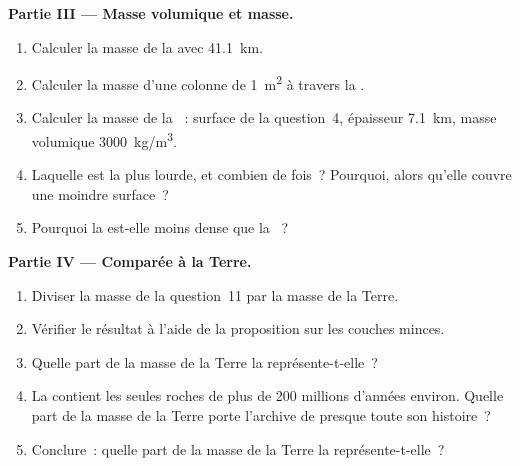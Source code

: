 \begin{problem}
\medskip
\noindent\textbf{Partie III --- Masse volumique et masse.}
\begin{enumerate}[resume]
  \item Calculer la masse de la  avec \qty{41.1}{km}.
  \item Calculer la masse d'une colonne de \qty{1}{m^2} à travers la .
  \item Calculer la masse de la ~: surface de la
        question~4, épaisseur \qty{7.1}{km}, masse volumique
        \qty{3000}{kg/m^3}.
  \item Laquelle est la plus lourde, et combien de fois~? Pourquoi, alors
        qu'elle couvre une moindre surface~?
  \item Pourquoi la  est-elle moins dense que la ~?
\end{enumerate}

\medskip
\noindent\textbf{Partie IV --- Comparée à la Terre.}
\begin{enumerate}[resume]
  \item Diviser la masse de la question~11 par la masse de la Terre.
  \item Vérifier le résultat à l'aide de la proposition sur les couches
        minces.
  \item Quelle part de la masse de la Terre la 
        représente-t-elle~?
  \item La  contient les seules roches de plus de 200
        millions d'années environ. Quelle part de la masse de la Terre porte
        l'archive de presque toute son histoire~?
  \item Conclure~: quelle part de la masse de la Terre la  représente-t-elle~?
\end{enumerate}
\end{problem}
